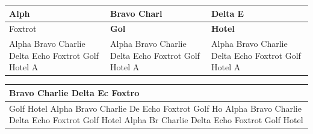 \documentclass[11pt,a4paper]{article}
\begin{document}
\begin{table}[h]
\begin{tabular}{|l|l|l|}
\hline
Alph & Bravo Charl & Delta E \\ \hline
Foxtrot  & \textbf{Gol} & \textbf{Hotel}  \\ \hline
Alpha Bravo  Charlie Delta Echo Foxtrot Golf Hotel A & Alpha Bravo  Charlie Delta Echo Foxtrot Golf Hotel A & Alpha Bravo  Charlie Delta Echo Foxtrot Golf Hotel A \\ \hline
\end{tabular}
\end{table}

\begin{table}[h]
\begin{tabular}{|l|}
\hline
Bravo Charlie Delta Ec  Foxtro \\ \hline
Golf Hotel Alpha Bravo Charlie De  Echo Foxtrot Golf Ho  Alpha Bravo Charlie Delta Echo Foxtrot  Golf Hotel Alpha Br  Charlie Delta Echo Foxtrot Golf Hotel  \\ \hline
\end{tabular}
\end{table}
\end{document}
